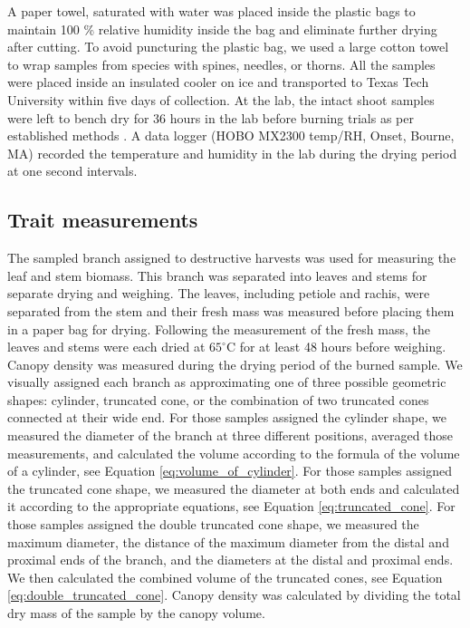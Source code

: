 \documentclass{bmcart}
\begin{document}
A paper towel, saturated with water was placed inside the plastic bags to maintain 100 \% relative humidity inside the bag and eliminate further drying after cutting. To avoid puncturing the plastic bag, we used a large cotton towel to wrap samples from species with spines, needles, or thorns. All the samples were placed inside an insulated cooler on ice and transported to Texas Tech University within five days of collection.  
At the lab, the intact shoot samples were left to bench dry for 36 hours in the lab before burning trials  as per established methods \citep{wyse2016quantitative}. A data logger (HOBO MX2300 temp/RH, Onset, Bourne, MA) recorded the temperature and humidity in the lab during the drying period at one second intervals.

\subsection*{Trait measurements}
The sampled branch assigned to destructive harvests was used for measuring the leaf and stem biomass. This branch was separated into leaves and stems for separate drying and weighing. The leaves, including petiole and rachis, were separated from the stem and their fresh mass was measured before placing them in a paper bag for drying. Following the measurement of the fresh mass, the leaves and stems were each dried at $65^{\circ}$C for at least 48 hours before weighing. Canopy density was measured during the drying period of the burned sample. We visually assigned each branch as approximating one of three possible geometric shapes: cylinder, truncated cone, or the combination of two truncated cones connected at their wide end. For those samples assigned the cylinder shape, we measured the diameter of the branch at three different positions, averaged those measurements, and calculated the volume according to the formula of the volume of a cylinder, see Equation \eqref{eq:volume_of_cylinder}. For those samples assigned the truncated cone shape, we measured the diameter at both ends and calculated it according to the appropriate equations, see Equation \eqref{eq:truncated_cone}. For those samples assigned the double truncated cone shape, we measured the maximum diameter, the distance of the maximum diameter from the distal and proximal ends of the branch, and the diameters at the distal and proximal ends. We then calculated the combined volume of the truncated cones,
see Equation \eqref{eq:double_truncated_cone}. Canopy density was calculated by dividing the total dry mass of the sample by the canopy volume.
\end{document}
